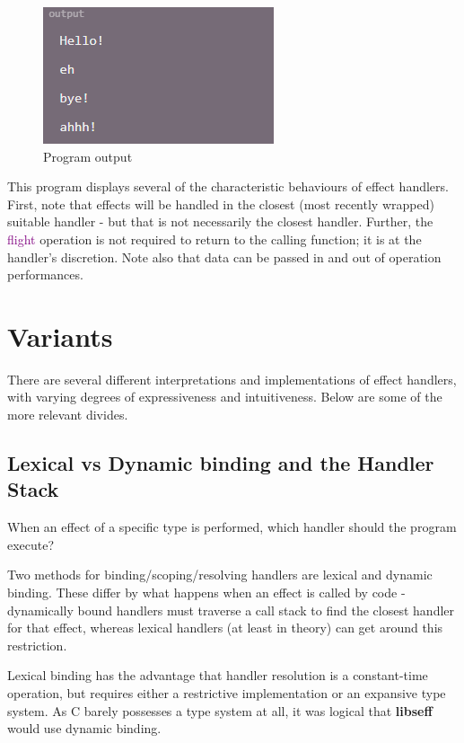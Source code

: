 \documentclass[logo,bsc,singlespacing,parskip,online]{infthesis}
\begin{document}
\begin{figure}[ht]
    \centering
    \includegraphics[width=0.5\linewidth]{effekt_2_out.png}
    \caption{Program output}
\end{figure}

This program displays several of the characteristic behaviours of effect handlers. First, note that effects will be handled in the closest (most recently wrapped) suitable handler - but that is not necessarily the closest handler. Further, the \textcolor{purple}{flight} operation is not required to return to the calling function; it is at the handler's discretion. Note also that data can be passed in and out of operation performances.


\section{Variants}
There are several different interpretations and implementations of effect handlers, with varying degrees of expressiveness and intuitiveness. Below are some of the more relevant divides.

\subsection{Lexical vs Dynamic binding and the Handler Stack}

When an effect of a specific type is performed, which handler should the program execute? 

Two methods for binding/scoping/resolving handlers are lexical and dynamic binding. These differ by what happens when an effect is called by code - dynamically bound handlers must traverse a call stack to find the closest handler for that effect, whereas lexical handlers (at least in theory) can get around this restriction.

Lexical binding has the advantage that handler resolution is a constant-time operation, but requires either a restrictive implementation or an expansive type system. As C barely possesses a type system at all, it was logical that \textbf{libseff} would use dynamic binding.
\end{document}
